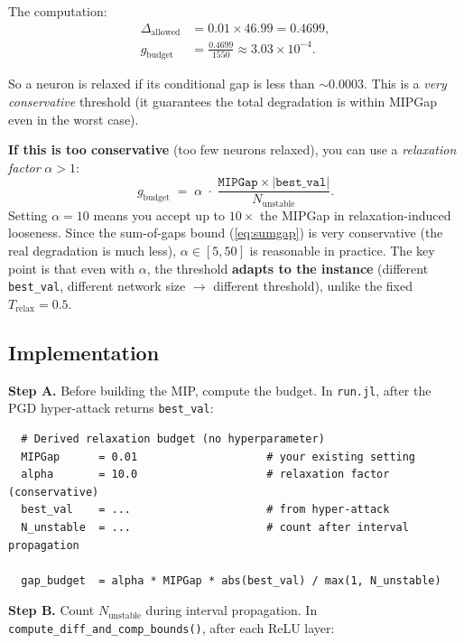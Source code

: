 \documentclass[11pt,a4paper]{article}
\newcommand{\Trelax}{T_{\mathrm{relax}}}
\begin{document}
\noindent
The computation:
\begin{align}
  \Delta_{\mathrm{allowed}}
    &= 0.01 \times 46.99 = 0.4699, \\
  g_{\mathrm{budget}}
    &= \frac{0.4699}{1550} \approx 3.03 \times 10^{-4}.
\end{align}

So a neuron is relaxed if its conditional gap is less than $\sim 0.0003$.
This is a \emph{very conservative} threshold (it guarantees the total
degradation is within MIPGap even in the worst case).

\medskip
\noindent
\textbf{If this is too conservative} (too few neurons relaxed), you can use a
\emph{relaxation factor} $\alpha > 1$:
\begin{equation}\label{eq:alpha}
  g_{\mathrm{budget}}
  \;=\;
  \alpha \;\cdot\;
  \frac{\texttt{MIPGap} \times |\texttt{best\_val}|}{N_{\mathrm{unstable}}}.
\end{equation}
Setting $\alpha = 10$ means you accept up to $10\times$ the MIPGap in
relaxation-induced looseness.  Since the sum-of-gaps bound
(\cref{eq:sumgap}) is very conservative (the real degradation is much less),
$\alpha \in [5, 50]$ is reasonable in practice.  The key point is that even
with $\alpha$, the threshold \textbf{adapts to the instance}
(different \texttt{best\_val}, different network size $\to$ different
threshold), unlike the fixed $\Trelax = 0.5$.

\subsection{Implementation}\label{sec:m7:impl}

\textbf{Step A.}  Before building the MIP, compute the budget.
In \texttt{run.jl}, after the PGD hyper-attack returns \texttt{best\_val}:

\begin{verbatim}
  # Derived relaxation budget (no hyperparameter)
  MIPGap      = 0.01                    # your existing setting
  alpha       = 10.0                    # relaxation factor (conservative)
  best_val    = ...                     # from hyper-attack
  N_unstable  = ...                     # count after interval propagation

  gap_budget  = alpha * MIPGap * abs(best_val) / max(1, N_unstable)
\end{verbatim}

\textbf{Step B.}  Count $N_{\mathrm{unstable}}$ during interval propagation.
In \texttt{compute\_diff\_and\_comp\_bounds()}, after each ReLU layer:
\end{document}
